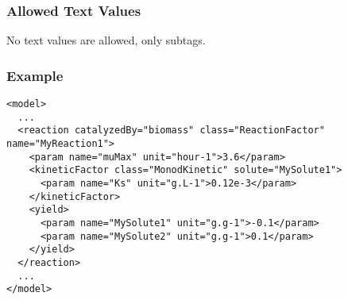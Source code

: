 \subsubsection{Allowed Text Values}

No text values are allowed, only subtags.

\subsubsection{Example}

\begin{verbatim}
<model>
  ...  
  <reaction catalyzedBy="biomass" class="ReactionFactor" name="MyReaction1">
    <param name="muMax" unit="hour-1">3.6</param>
    <kineticFactor class="MonodKinetic" solute="MySolute1">
      <param name="Ks" unit="g.L-1">0.12e-3</param>
    </kineticFactor>
    <yield>
      <param name="MySolute1" unit="g.g-1">-0.1</param>
      <param name="MySolute2" unit="g.g-1">0.1</param>
    </yield>
  </reaction>
  ...  
</model>
\end{verbatim}
